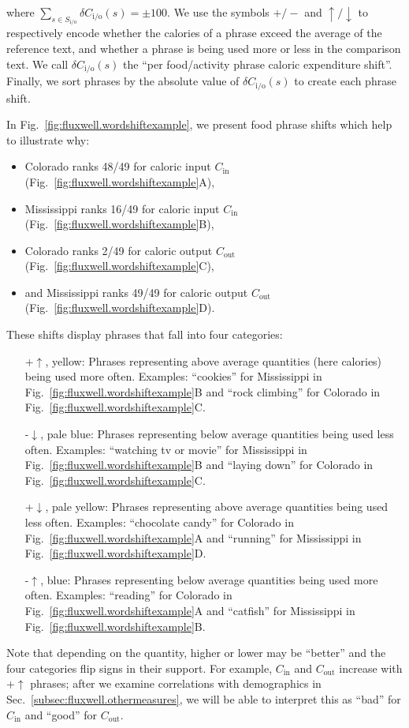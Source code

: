 \documentclass[10pt]{article}
\newcommand{\calin}{C_{\textrm{in}}}
\newcommand{\calout}{C_{\textrm{out}}}
\newcommand{\calinoutfn}[1]{C_{\textrm{i/o}}(#1)}
\newcommand{\phrasesymbol}{s}
\newcommand{\phrasesetsymbol}{S}
\newcommand{\foodactivityphrase}{\phrasesymbol}
\newcommand{\foodactivityphraseset}{\phrasesetsymbol_{\textrm{i/o}}}
\begin{document}
where $\sum_{\foodactivityphrase \in \foodactivityphraseset} 
\delta \calinoutfn{\foodactivityphrase} = \pm 100$.
We use the symbols $+/-$ and $\uparrow/\downarrow$ 
to respectively encode 
whether the calories of a phrase exceed the average
of the reference text,
and whether a phrase is being used more or less
in the comparison text.
We call $\delta \calinoutfn{\foodactivityphrase}$ the 
``per food/activity phrase caloric expenditure shift''.
Finally, we sort phrases by the absolute value of 
$\delta \calinoutfn{\foodactivityphrase}$ to
create each phrase shift.

In Fig.~\ref{fig:fluxwell.wordshiftexample}, we present 
food phrase shifts which help to illustrate why:
\begin{itemize}
\item 
  Colorado ranks 48/49 for caloric input $\calin$
  (Fig.~\ref{fig:fluxwell.wordshiftexample}A),
\item 
  Mississippi ranks 16/49 for caloric input $\calin$
  (Fig.~\ref{fig:fluxwell.wordshiftexample}B),
\item 
  Colorado ranks 2/49 for caloric output $\calout$
  (Fig.~\ref{fig:fluxwell.wordshiftexample}C),
\item 
  and Mississippi ranks 49/49 for caloric output  $\calout$
  (Fig.~\ref{fig:fluxwell.wordshiftexample}D).
\end{itemize}

These shifts display phrases that fall into four categories:
\begin{itemize}[leftmargin=64pt]
\item[+$\uparrow$, yellow:]
  Phrases representing above average quantities (here calories)
  being used more often.
  Examples: 
  ``cookies'' for Mississippi in
  Fig.~\ref{fig:fluxwell.wordshiftexample}B
  and 
  ``rock climbing'' for Colorado in Fig.~\ref{fig:fluxwell.wordshiftexample}C.
\item[-$\downarrow$, pale blue:]
  Phrases representing below average quantities
  being used less often.
  Examples: 
  ``watching tv or movie'' for Mississippi in
  Fig.~\ref{fig:fluxwell.wordshiftexample}B
  and 
  ``laying down'' for Colorado in
  Fig.~\ref{fig:fluxwell.wordshiftexample}C.
\item[+$\downarrow$, pale yellow:]
  Phrases representing above average quantities
  being used less often.
  Examples: 
  ``chocolate candy'' for Colorado in
  Fig.~\ref{fig:fluxwell.wordshiftexample}A
  and 
  ``running'' for Mississippi in Fig.~\ref{fig:fluxwell.wordshiftexample}D.
\item[-$\uparrow$, blue:]
  Phrases representing below average quantities
  being used more often.
  Examples: 
  ``reading'' for Colorado 
  in Fig.~\ref{fig:fluxwell.wordshiftexample}A
  and
  ``catfish'' for Mississippi in
  Fig.~\ref{fig:fluxwell.wordshiftexample}B.
\end{itemize}
Note that depending on the quantity, higher or lower may be ``better''
and the four categories flip signs in their support.
For example, $\calin$ and $\calout$ increase with +$\uparrow$ phrases;
after we examine correlations with demographics in 
Sec.~\ref{subsec:fluxwell.othermeasures},
we will be able to interpret this as ``bad'' for $\calin$ and ``good'' for
$\calout$.
\end{document}
